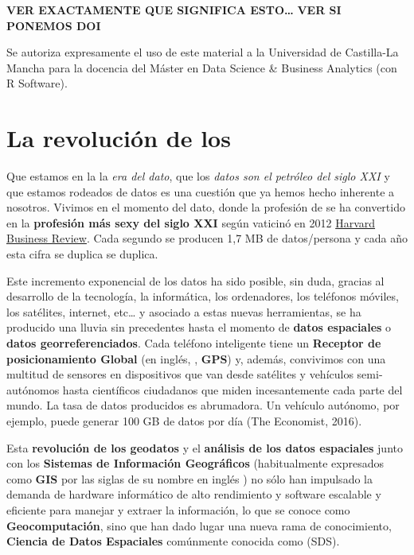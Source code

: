 \documentclass[
]{book}
\theoremstyle{definition}
\theoremstyle{definition}
\theoremstyle{definition}
\theoremstyle{definition}
\theoremstyle{remark}
\begin{document}
\textbf{VER EXACTAMENTE QUE SIGNIFICA ESTO\ldots{} }
\textbf{VER SI PONEMOS DOI}

Se autoriza expresamente el uso de este material a la Universidad
de Castilla-La Mancha para la docencia del Máster en Data Science \&
Business Analytics (con R Software).

\hypertarget{la-revoluciuxf3n-de-los}{%
\chapter{\texorpdfstring{La revolución de los }{La revolución de los }}\label{la-revoluciuxf3n-de-los}}

Que estamos en la la \emph{era del dato}, que los \emph{datos son el petróleo del siglo
XXI} y que estamos rodeados de datos es una cuestión que ya hemos hecho
inherente a nosotros. Vivimos en el momento del dato, donde la profesión de
 se ha convertido en la \textbf{profesión más sexy del siglo XXI}
según vaticinó en 2012 \href{https://hbr.org/2012/10/data-scientist-the-sexiest-job-of-the-21st-century}{Harvard Business
Review}.
Cada segundo se producen 1,7 MB de datos/persona y cada año esta cifra se
duplica se duplica.

Este incremento exponencial de los datos ha sido posible, sin duda, gracias al
desarrollo de la tecnología, la informática, los ordenadores, los teléfonos
móviles, los satélites, internet, etc\ldots{} y asociado a estas nuevas herramientas,
se ha producido una lluvia sin precedentes hasta el momento de \textbf{datos
espaciales} o \textbf{datos georreferenciados}. Cada teléfono inteligente tiene un
\textbf{Receptor de posicionamiento Global} (en inglés, ,
\textbf{GPS}) y, además, convivimos con una multitud de sensores en dispositivos que
van desde satélites y vehículos semi-autónomos hasta científicos ciudadanos que
miden incesantemente cada parte del mundo. La tasa de datos producidos es
abrumadora. Un vehículo autónomo, por ejemplo, puede generar 100 GB de datos por
día (The Economist, 2016).

Esta \textbf{revolución de los geodatos} y el \textbf{análisis de los datos espaciales}
junto con los \textbf{Sistemas de Información Geográficos} (habitualmente expresados
como \textbf{GIS} por las siglas de su nombre en inglés ) no sólo han impulsado la demanda de hardware informático de alto
rendimiento y software escalable y eficiente para manejar y extraer la
información, lo que se conoce como \textbf{Geocomputación}, sino que han dado lugar
una nueva rama de conocimiento, \textbf{Ciencia de Datos Espaciales} comúnmente
conocida como  (SDS).
\end{document}
